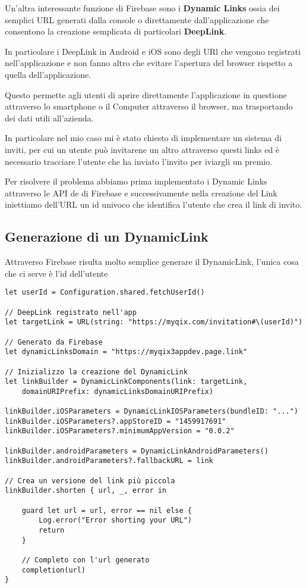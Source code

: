 
Un'altra interessante funzione di Firebase sono i \textbf{Dynamic Links}
ossia dei semplici URL generati dalla console o direttamente dall'applicazione
che consentono la creazione semplicata di particolari \textbf{DeepLink}.

In particolare i DeepLink in Android e iOS sono degli URl che vengono registrati nell'applicazione
e non fanno altro che evitare l'apertura del browser rispetto a quella dell'applicazione.

Questo permette agli utenti di aprire direttamente l'applicazione in questione
attraverso lo smartphone o il Computer attraverso il browser, ma trasportando dei dati utili all'azienda.



In particolare nel mio caso mi è stato chiesto di implementare un sistema di inviti, per cui 
un utente può invitarene un altro attraverso questi links ed è necessario tracciare
l'utente che ha inviato l'invito per iviargli un premio.

Per risolvere il problema abbiamo prima implementato i Dynamic Links attraverso le API de
di Firebase e successivamente nella creazione del Link iniettiamo dell'URL un id univoco che identifica l'utente
che crea il link di invito.

\subsection{Generazione di un DynamicLink}

Attraverso Firebase risulta molto semplice generare il DynamicLink,
l'unica cosa che ci serve è l'id dell'utente

\begin{verbatim}
let userId = Configuration.shared.fetchUserId() 

// DeepLink registrato nell'app
let targetLink = URL(string: "https://myqix.com/invitation#\(userId)")

// Generato da Firebase
let dynamicLinksDomain = "https://myqix3appdev.page.link"

// Inizializzo la creazione del DynamicLink
let linkBuilder = DynamicLinkComponents(link: targetLink,
    domainURIPrefix: dynamicLinksDomainURIPrefix)

linkBuilder.iOSParameters = DynamicLinkIOSParameters(bundleID: "...")
linkBuilder.iOSParameters?.appStoreID = "1459917691"
linkBuilder.iOSParameters?.minimumAppVersion = "0.0.2"

linkBuilder.androidParameters = DynamicLinkAndroidParameters()
linkBuilder.androidParameters?.fallbackURL = link

// Crea un versione del link più piccola
linkBuilder.shorten { url, _, error in
    
    guard let url = url, error == nil else {
        Log.error("Error shorting your URL")
        return
    }
    
    // Completo con l'url generato
    completion(url)
}

\end{verbatim}

